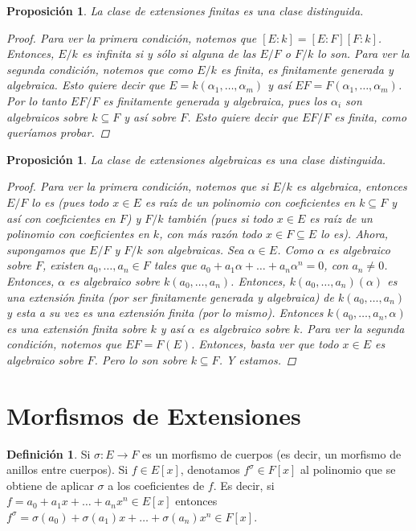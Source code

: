 \documentclass[12pt]{book}
\newtheorem{prop}[teo]{Proposición}
\theoremstyle{definition}
\newtheorem{defn}[teo]{Definición}
\begin{document}
\begin{prop}
La clase de extensiones finitas es una clase distinguida.
\begin{proof}
Para ver la primera condición, notemos que $[E:k] = [E:F][F:k]$. Entonces, $E/k$ es infinita si y sólo si alguna de las $E/F$ o $F/k$ lo son. Para ver la segunda condición, notemos que como $E/k$ es finita, es finitamente generada y algebraica. Esto quiere decir que $E=k(\alpha_1,\ldots ,\alpha_m)$ y así $EF=F(\alpha_1,\ldots ,\alpha_m)$. Por lo tanto $EF/F$ es finitamente generada y algebraica, pues los $\alpha_i$ son algebraicos sobre $k\subseteq F$ y así sobre $F$. Esto quiere decir que $EF/F$ es finita, como queríamos probar.
\end{proof}
\end{prop}

\begin{prop}
La clase de extensiones algebraicas es una clase distinguida.
\begin{proof}
Para ver la primera condición, notemos que si $E/k$ es algebraica, entonces $E/F$ lo es (pues todo $x\in E$ es raíz de un polinomio con coeficientes en $k\subseteq F$ y así con coeficientes en $F$) y $F/k$ también (pues si todo $x\in E$ es raíz de un polinomio con coeficientes en $k$, con más razón todo $x\in F\subseteq E$ lo es). Ahora, supongamos que $E/F$ y $F/k$ son algebraicas. Sea $\alpha\in E$. Como $\alpha$ es algebraico sobre $F$, existen $a_0,\ldots ,a_n\in F$ tales que $a_0 + a_1 \alpha + \ldots + a_n\alpha^n = 0$, con $a_n\neq 0$. Entonces, $\alpha$ es algebraico sobre $k(a_0,\ldots , a_n)$. Entonces, $k(a_0,\ldots , a_n)(\alpha)$ es una extensión finita (por ser finitamente generada y algebraica) de $k(a_0,\ldots ,a_n)$ y esta a su vez es una extensión finita (por lo mismo). Entonces $k(a_0,\ldots ,a_n,\alpha)$ es una extensión finita sobre $k$ y así $\alpha$ es algebraico sobre $k$.
Para ver la segunda condición, notemos que $EF=F(E)$. Entonces, basta ver que todo $x\in E$ es algebraico sobre $F$. Pero lo son sobre $k\subseteq F$. Y estamos.
\end{proof}
\end{prop}

\section{Morfismos de Extensiones}

\begin{defn}
Si $\sigma:E\to F$ es un morfismo de cuerpos (es decir, un morfismo de anillos entre cuerpos). Si $f\in E[x]$, denotamos $f^\sigma\in F[x]$ al polinomio que se obtiene de aplicar $\sigma$ a los coeficientes de $f$. Es decir, si $f=a_0 + a_1x+ \ldots + a_n x^n\in E[x]$ entonces $f^\sigma = \sigma(a_0) + \sigma(a_1)x + \ldots + \sigma(a_n)x^n\in F[x]$.
\end{defn}
\end{document}
